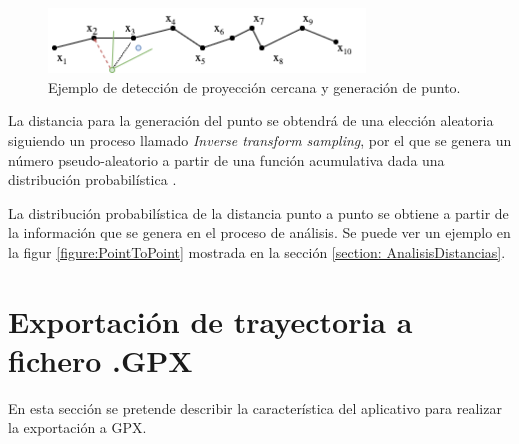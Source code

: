 \begin{figure}[htb]
\begin{center}
\includegraphics[width=0.75\textwidth]{./Imagenes/PointGeneration02.png}
\caption{Ejemplo de detección de proyección cercana y generación de punto.}
\label{fig:PointGeneration02}
\end{center}
\end{figure}

La distancia para la generación del punto se obtendrá de una elección aleatoria siguiendo un proceso 
llamado \textit{Inverse transform sampling}, por el que se genera un número pseudo-aleatorio a partir 
de una función acumulativa dada una distribución probabilística \cite{Sigman01}.

La distribución probabilística de la distancia punto a punto se obtiene a partir de la información 
que se genera en el proceso de análisis. Se puede ver un ejemplo en la figur 
\ref{figure:PointToPoint} mostrada en la sección \ref{section: AnalisisDistancias}.

\section{Exportación de trayectoria a fichero .\ac{GPX}}
En esta sección se pretende describir la característica del aplicativo para realizar la exportación a GPX.
